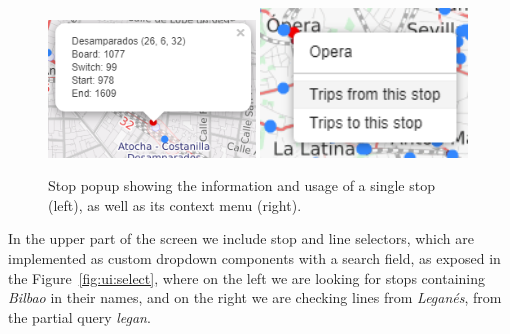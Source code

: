 	
	\begin{figure}[ht]
		\begin{center}
			{\includegraphics[width=0.49\textwidth]{screens/stop_fix.png}}
			{\includegraphics[width=0.49\textwidth]{screens/rclick_cut.png}}
		\end{center}
		\caption{Stop popup showing the information and usage of a single stop (left), as well as its context menu (right).}
		\label{fig:ui:stop}
	\end{figure}
	
	In the upper part of the screen we include stop and line selectors, which are implemented as custom dropdown components with a search field, as exposed in the Figure~\ref{fig:ui:select}, where on the left we are looking for stops containing \textit{Bilbao} in their names, and on the right we are checking lines from \textit{Leganés}, from the partial query \textit{legan}.
	
